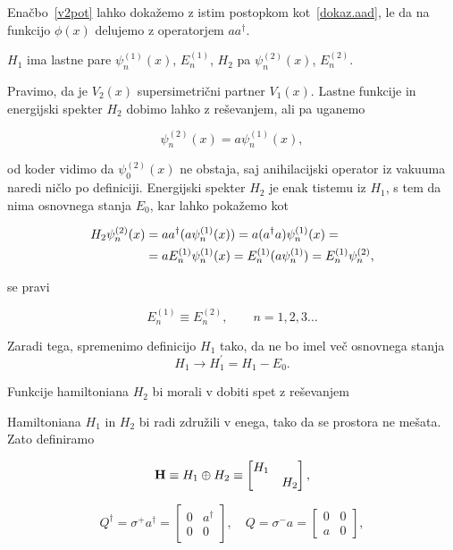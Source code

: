 Ena\v cbo~\eqref{v2pot} lahko doka\v zemo z istim postopkom kot~\eqref{dokaz.aad}, le da na funkcijo $\phi(x)$
delujemo z operatorjem $aa^\dagger$.

$H_1$ ima lastne pare $\psi^{(1)}_n(x)$, $E^{(1)}_n$, $H_2$ pa $\psi^{(2)}_n(x)$, $E^{(2)}_n$.

Pravimo, da je $V_2(x)$ supersimetri\v cni partner $V_1(x)$. Lastne funkcije in energijski spekter $H_2$
dobimo lahko z re\v sevanjem, ali pa uganemo

\begin{equation}
	\psi^{(2)}_n(x) = a\psi^{(1)}_n(x),
\end{equation}

od koder vidimo da $\psi^{(2)}_0(x)$ ne obstaja, saj anihilacijski operator iz vakuuma naredi
ni\v clo po definiciji. Energijski spekter $H_2$ je enak tistemu iz $H_1$, s tem da nima
osnovnega stanja $E_0$, kar lahko poka\v zemo kot

\begin{align}
	H_2\psi^{(2)}_n(x) &= aa^\dagger (a\psi^{(1)}_n(x)) = a(a^\dagger a)\psi^{(1)}_n(x) = \notag \\
		&= aE^{(1)}_n\psi^{(1)}_n(x) = E_n^{(1)}(a\psi_n^{(1)}) = E_n^{(1)}\psi_n^{(2)},
	\label{degenener}
\end{align}

se pravi

\begin{equation}
	E^{(1)}_n \equiv E^{(2)}_n, \qquad n = 1, 2, 3 \ldots
\end{equation}

Zaradi tega, spremenimo definicijo $H_1$ tako, da ne bo imel ve\v c osnovnega stanja
\begin{equation}
	H_1 \to H_1^\prime = H_1 - E_0.
\end{equation}

Funkcije hamiltoniana $H_2$ bi morali v dobiti spet z re\v sevanjem 

Hamiltoniana $H_1$ in $H_2$ bi radi zdru\v zili v enega, tako da se prostora ne me\v sata. Zato
definiramo

\begin{equation}
	\mathbf{H} \equiv H_1 \oplus H_2 \equiv \begin{bmatrix}H_1 & \\
		& H_2 \end{bmatrix},
\end{equation}

\begin{equation}
	Q^\dagger = \sigma^+ a^\dagger = \begin{bmatrix} 0 & a^\dagger \\
		0 & 0 \end{bmatrix}, \quad
	Q = \sigma^- a = \begin{bmatrix} 0 & 0 \\
		a & 0 \end{bmatrix},
\end{equation}

